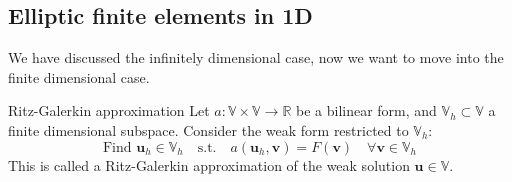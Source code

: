 \subsection*{Elliptic finite elements in 1D}
We have discussed the infinitely dimensional case, now we want to move into the finite dimensional case.

\begin{definition}{Ritz-Galerkin approximation}{}
    Let $a: \mathbb{V} \times \mathbb{V} \to \mathbb{R}$ be a bilinear form, and $\mathbb{V}_h \subset \mathbb{V}$ a finite dimensional subspace.
    Consider the weak form restricted to $\mathbb{V}_h$:
    \[\text{Find } \mathbf{u}_h \in \mathbb{V}_h \quad \text{s.t.} \quad a(\mathbf{u}_h, \mathbf{v}) = F(\mathbf{v}) \quad \forall \mathbf{v} \in \mathbb{V}_h\]
    This is called a Ritz-Galerkin approximation of the weak solution $\mathbf{u} \in \mathbb{V}$.
\end{definition}

